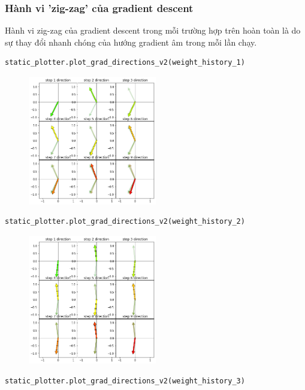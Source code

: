 \documentclass{book}
\begin{document}
\subsubsection{Hành vi 'zig-zag' của gradient descent}
Hành vi zig-zag của gradient descent trong mỗi trường hợp trên hoàn toàn là do sự thay đổi nhanh chóng của hướng gradient âm trong mỗi lần chạy.
\begin{lstlisting}[language=python]
    static_plotter.plot_grad_directions_v2(weight_history_1)
\end{lstlisting}
\begin{figure}[H]
    \centering
    \includegraphics[width=0.5\textwidth]{images/zig-zag_behaviours_2.png}
\end{figure}
\begin{lstlisting}[language=python]
    static_plotter.plot_grad_directions_v2(weight_history_2)
\end{lstlisting}
\begin{figure}[H]
    \centering
    \includegraphics[width=0.5\textwidth]{images/zig-zag_behaviours_3.png}
\end{figure}
\begin{lstlisting}[language=python]
    static_plotter.plot_grad_directions_v2(weight_history_3)
\end{lstlisting}
\end{document}
